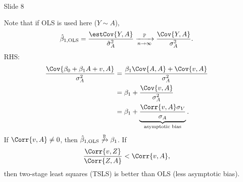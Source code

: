 \begin{Regular}{Slide 8}
\begin{itemize}
    \end{itemize}
    Note that if OLS is used here ($ Y \sim A $),
    \[ \hat{\beta}_{1,\OLS}=\frac{\estCov{Y,A}}{\hat{\sigma}_A^2}\xrightarrow[n\to\infty]{\mathbb{P}}\frac{\Cov{Y,A}}{\sigma_A^2}. \]
    RHS\@:
    \begin{align*}
        \frac{\Cov{\beta_0+\beta_1A+v,A}}{\sigma_A^2}
         & =\frac{\beta_1\Cov{A,A}+\Cov{v,A}}{\sigma_A^2}                                      \\
         & =\beta_1+\frac{\Cov{v,A}}{\sigma_A^2}                                               \\
         & =\beta_1+\underbrace{\frac{\Corr{v,A}\sigma_V}{\sigma_A}}_{\text{asymptotic bias}}.
    \end{align*}
    If $ \Corr{v,A}\ne 0 $, then $ \hat{\beta}_{1,\text{OLS}}\not\xrightarrow{\mathbb{P}}\beta_1 $.
    If
    \[ \frac{\Corr{v,Z}}{\Corr{Z,A}}<\Corr{v,A}, \]
    then two-stage least squares (TSLS) is better than OLS (less asymptotic bias).
\end{Regular}